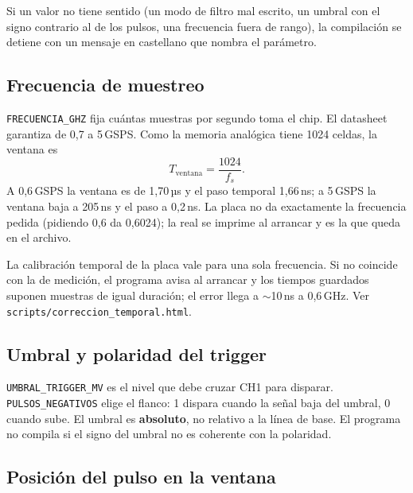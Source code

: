 \documentclass[11pt,a4paper]{article}
\newcommand{\code}[1]{\texttt{#1}}
\begin{document}
Si un valor no tiene sentido (un modo de filtro mal escrito, un umbral con el signo
contrario al de los pulsos, una frecuencia fuera de rango), la compilación se
detiene con un mensaje en castellano que nombra el parámetro.

\subsection{Frecuencia de muestreo}

\code{FRECUENCIA\_GHZ} fija cuántas muestras por segundo toma el chip. El datasheet
garantiza de 0{,}7 a 5\,GSPS. Como la memoria analógica tiene 1024 celdas, la ventana
es
\[
  T_{\text{ventana}} = \frac{1024}{f_s}.
\]
A 0{,}6\,GSPS la ventana es de 1{,}70\,µs y el paso temporal 1{,}66\,ns; a 5\,GSPS la
ventana baja a 205\,ns y el paso a 0{,}2\,ns. La placa no da exactamente la
frecuencia pedida (pidiendo 0{,}6 da 0{,}6024); la real se imprime al arrancar y es
la que queda en el archivo.

\begin{aviso}
La calibración temporal de la placa vale para una sola frecuencia. Si no coincide con
la de medición, el programa avisa al arrancar y los tiempos guardados suponen
muestras de igual duración; el error llega a $\sim$10\,ns a 0{,}6\,GHz. Ver
\code{scripts/correccion\_temporal.html}.
\end{aviso}

\subsection{Umbral y polaridad del trigger}

\code{UMBRAL\_TRIGGER\_MV} es el nivel que debe cruzar CH1 para disparar.
\code{PULSOS\_NEGATIVOS} elige el flanco: 1 dispara cuando la señal baja del umbral,
0 cuando sube. El umbral es \textbf{absoluto}, no relativo a la línea de base. El
programa no compila si el signo del umbral no es coherente con la polaridad.

\subsection{Posición del pulso en la ventana}
\label{sec:posicion}
\end{document}
